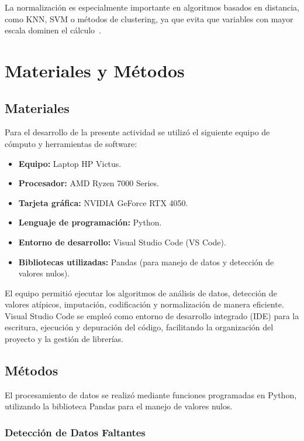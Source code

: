 \documentclass[12pt]{article}
\begin{document}
La normalización es especialmente importante en algoritmos basados en distancia, como KNN, SVM o métodos de clustering, ya que evita que variables con mayor escala dominen el cálculo~\cite{hastie2009elements}.

\section{Materiales y Métodos}

\subsection{Materiales}

Para el desarrollo de la presente actividad se utilizó el siguiente equipo de cómputo y herramientas de software:

\begin{itemize}
    \item \textbf{Equipo:} Laptop HP Victus.
    \item \textbf{Procesador:} AMD Ryzen 7000 Series.
    \item \textbf{Tarjeta gráfica:} NVIDIA GeForce RTX 4050.
    \item \textbf{Lenguaje de programación:} Python.
    \item \textbf{Entorno de desarrollo:} Visual Studio Code (VS Code).
    \item \textbf{Bibliotecas utilizadas:} Pandas (para manejo de datos y detección de valores nulos).
\end{itemize}

El equipo permitió ejecutar los algoritmos de análisis de datos, detección de valores atípicos, imputación, codificación y normalización de manera eficiente. Visual Studio Code se empleó como entorno de desarrollo integrado (IDE) para la escritura, ejecución y depuración del código, facilitando la organización del proyecto y la gestión de librerías.

\subsection{Métodos}

El procesamiento de datos se realizó mediante funciones programadas en Python, utilizando la biblioteca Pandas para el manejo de valores nulos.

\subsubsection{Detección de Datos Faltantes}
\end{document}
